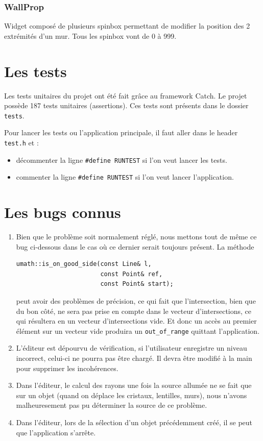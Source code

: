 \documentclass[]{report}
\begin{document}
\subsubsection{\label{WallProp}WallProp}

Widget composé de plusieurs spinbox permettant de modifier la position des 2 extrémités d’un mur. Tous les spinbox vont de 0 à 999.

\newpage
\section{Les tests}

Les tests unitaires du projet ont été fait grâce au framework Catch. Le projet possède 187 tests unitaires (assertions).
Ces tests sont présents dans le dossier \texttt{tests}.

Pour lancer les tests ou l'application principale, il faut aller dans le header \texttt{test.h} et :
\begin{itemize}
\item décommenter la ligne \texttt{\#define RUNTEST} si l'on veut lancer les tests.
\item commenter la ligne \texttt{\#define RUNTEST} si l'on veut lancer l'application.
\end{itemize}

\section{Les bugs connus}

\begin{enumerate}
\item Bien que le problème soit normalement réglé, nous mettons tout de même ce bug ci-dessous dans le cas où ce dernier
serait toujours présent.
La méthode 
\begin{lstlisting}
umath::is_on_good_side(const Line& l, 
                       const Point& ref,
                       const Point& start);
\end{lstlisting}
peut avoir des problèmes de précision, ce qui fait que l'intersection, bien que du bon côté, ne sera pas 
prise en compte dans le vecteur d'intersections, ce qui résultera en un vecteur d'intersections vide. Et donc un
accès au premier élément sur un vecteur vide produira un \texttt{out\_of\_range} quittant l'application.


\item L'éditeur est dépourvu de vérification, si l'utilisateur enregistre un niveau incorrect, celui-ci ne pourra pas être chargé. 
Il devra être modifié à la main pour supprimer les incohérences.
\item Dans l'éditeur, le calcul des rayons une fois la source allumée ne se fait que sur un objet
(quand on déplace les cristaux, lentilles, murs),
nous n'avons malheuresement pas pu déterminer la source de ce problème.
\item Dans l'éditeur, lors de la sélection d'un objet précédemment créé, il se peut que l'application s'arrête.
\end{enumerate}
\end{document}
